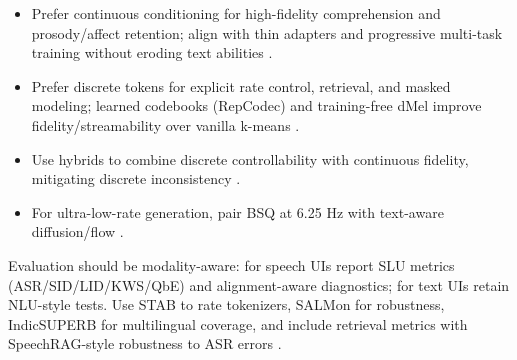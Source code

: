 \begin{itemize}
  \item Prefer continuous conditioning for high-fidelity comprehension and prosody/affect retention; align with thin adapters and progressive multi-task training without eroding text abilities \cite{li2025continuousspeechtokenizertext,wang2023slmbridgethingapbetweenspeechtextfoundat}.
  \item Prefer discrete tokens for explicit rate control, retrieval, and masked modeling; learned codebooks (RepCodec) and training-free dMel improve fidelity/streamability over vanilla k-means \cite{huang2024repcodecspeechrepresentationcodectokeniz,bai2025dmelspeechtokenizationmadesimple}.
  \item Use hybrids to combine discrete controllability with continuous fidelity, mitigating discrete inconsistency \cite{guo2025recentadvancesdiscretespeechtokensreview,liu2024analyzingmitigatinginconsistencydiscrete}.
  \item For ultra-low-rate generation, pair BSQ at 6.25 Hz with text-aware diffusion/flow \cite{wang2025tadicodectextawarediffusionspeechtokeniz}.
\end{itemize}

Evaluation should be modality-aware: for speech UIs report SLU metrics (ASR/SID/LID/KWS/QbE) and alignment-aware diagnostics; for text UIs retain NLU-style tests. Use STAB to rate tokenizers, SALMon for robustness, IndicSUPERB for multilingual coverage, and include retrieval metrics with SpeechRAG-style robustness to ASR errors \cite{tan2025ssralignmentawaremodalityconnectorspeech,vashishth2024stabspeechtokenizerassessmentbenchmark,maimon2025salmonsuiteacousticlanguagemodelevaluati,entry2025indicsuperbspeechprocessinguniversalperf,min2025speechretrievalaugmentedgenerationwithou}.


